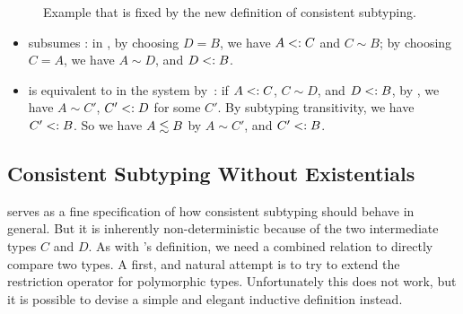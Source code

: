 \begin{figure}[t]
  \centering
  \caption{Example that is fixed by the new definition of consistent subtyping.}
  \label{fig:example:c:fix}
\end{figure}


\begin{mprop}\leavevmode
  \label{prop:subsumes}
\begin{itemize}
  \item {} subsumes
    :
    in ,
    by choosing $D=B$, we have $A<: C$ and $C \sim B$; by choosing $C=A$, we have
    $A \sim D$, and $D <: B$.
  \item {} is equivalent to
     in the system by~\citet{siek2007gradual}:
    if $A <: C$, $C \sim D$, and $D <:
    B$, by ,
    we have $A \sim C'$, $C' <: D$ for some $C'$. By subtyping
    transitivity, we have $C' <: B$. So we have $A \lesssim B$ by $A \sim C'$, and $C'
    <: B$.
  \end{itemize}
\end{mprop}

\subsection{Consistent Subtyping Without Existentials}

 serves as a fine specification of how consistent
subtyping should behave in general. But it is inherently non-deterministic
because of the two intermediate types $C$ and $D$. As with
\citet{siek2007gradual}'s definition,
we need a combined relation to directly compare two types. A first,
and natural attempt is to try to extend the restriction operator for
polymorphic types. 
Unfortunately this does not work, but it is possible to devise a
simple and elegant inductive definition instead.

